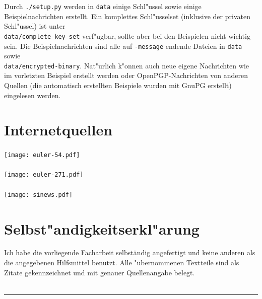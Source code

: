 \documentclass[12pt]{article}
\begin{document}
Durch \verb|./setup.py| werden in \texttt{data} einige Schl"ussel sowie einige Beispielnachrichten erstellt.
Ein komplettes Schl"usselset (inklusive der privaten Schl"ussel) ist unter \\ \texttt{data/complete-key-set} verf"ugbar,
sollte aber bei den Beispielen nicht wichtig sein.
Die Beispielnachrichten sind alle auf \texttt{-message} endende Dateien in \texttt{data} sowie \\ \texttt{data/encrypted-binary}.
Nat"urlich k"onnen auch neue eigene Nachrichten wie im vorletzten Beispiel erstellt werden
oder OpenPGP-Nachrichten von anderen Quellen (die automatisch erstellten Beispiele wurden mit GnuPG erstellt) eingelesen werden.

\section{Internetquellen}

\paragraph{\cite{euler41}}
\texttt{[image: euler-54.pdf]}
\paragraph{\cite{euler63}}
\texttt{[image: euler-271.pdf]}
\paragraph{\cite{sinews}}
\texttt{[image: sinews.pdf]}

\newpage
\section{Selbst"andigkeitserkl"arung}
Ich habe die vorliegende Facharbeit selbständig angefertigt und keine anderen als die angegebenen Hilfsmittel benutzt.
Alle "ubernommenen Textteile sind als Zitate gekennzeichnet und mit genauer Quellenangabe belegt. \\~\\
\rule{0.3\textwidth}{1pt}~\\
\piisignature
\end{document}

